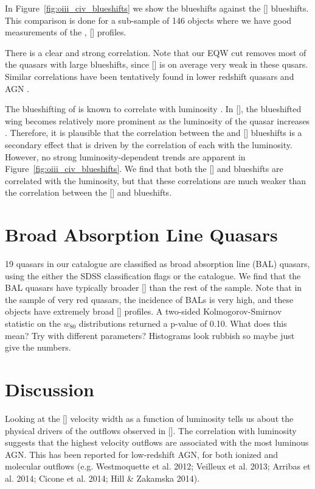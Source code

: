 In Figure~\ref{fig:oiii_civ_blueshifts} we show the  blueshifts against the [] blueshifts.
This comparison is done for a sub-sample of 146 objects where we have good measurements of the , [] profiles. 

There is a clear and strong correlation. 
Note that our EQW cut removes most of the quasars with large  blueshifts, since [] is on average very weak in these qusars. 
Similar correlations have been tentatively found in lower redshift quasars and \ac{AGN} \citep{zamanov02}. 

The blueshifting of  is known to correlate with luminosity \citep{richards11}.
In [], the blueshifted wing becomes relatively more prominent as the luminosity of the quasar increases \citep{shen14}. 
Therefore, it is plausible that the correlation between the  and [] blueshifts is a secondary effect that is driven by the correlation of each with the luminosity. 
However, no strong luminosity-dependent trends are apparent in Figure~\ref{fig:oiii_civ_blueshifts}. 
We find that both the [] and  blueshifts are correlated with the luminosity, but that these correlations are much weaker than the correlation between the [] and  blueshifts. 

\section{Broad Absorption Line Quasars}

19 quasars in our catalogue are classified as broad absorption line (BAL) quasars, using the either the SDSS classification flags or the \citet{allen11} catalogue. 
We find that the BAL quasars have typically broader [] than the rest of the sample. 
Note that in the \citet{zakamska16} sample of very red quasars, the incidence of BALs is very high, and these objects have extremely broad [] profiles. 
A two-sided Kolmogorov-Smirnov statistic on the $w_{80}$ distributions returned a p-value of 0.10. 
What does this mean?
Try with different parameters?
Histograms look rubbish so maybe just give the numbers. 

\section{Discussion}

Looking at the [] velocity width as a function of luminosity tells us about the physical drivers of the outflows observed in []. 
The correlation with luminosity suggests that the highest velocity outflows are associated with the most luminous \ac{AGN}. 
This has been reported for low-redshift \ac{AGN}, for both ionized and molecular outflows (e.g. Westmoquette et al. 2012; Veilleux et al. 2013; Arribas et al. 2014; Cicone et al. 2014; Hill \& Zakamska 2014).

